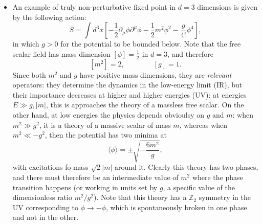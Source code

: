 \documentclass[a4paper,12pt]{article}
\numberwithin{equation}{section}
\begin{document}
\begin{itemize}
\item
An example of truly non-perturbative fixed point in $d = 3$ dimensions is given by the following action:
\begin{equation}
	S = \int d^3x \left[
	-\frac{1}{2} \partial_\mu \phi \partial^\mu \phi
	- \frac{1}{2} m^2 \phi^2 - \frac{g}{4!} \phi^4 \right],
\end{equation}
in which $g > 0$ for the potential to be bounded below.
Note that the free scalar field has mass dimension $\left[ \phi \right] = \frac{1}{2}$ in $d = 3$, and therefore
\begin{equation}
	\left[ m^2 \right] = 2,
	\qquad\qquad
	\left[ g \right] = 1.
\end{equation}
Since both $m^2$ and $g$ have positive mass dimensions, they are \emph{relevant} operators: they determine the dynamics in the low-energy limit (IR), but their importance decreases at higher and higher energies (UV): at energies $E \gg g, |m|$, this is approaches the theory of a massless free scalar.
On the other hand, at low energies the physics depends obvioulsy on $g$ and $m$: when $m^2 \gg g^2$, it is a theory of a massive scalar of mass $m$, whereas when $m^2 \ll -g^2$, then the potential has two minima at
\begin{equation}
	\langle \phi \rangle = \pm \sqrt{- \frac{6m^2}{g}},
\end{equation}
with excitations fo mass $\sqrt{2} |m|$ around it. Clearly this theory has two phases, and there must therefore be an intermediate value of $m^2$ where the phase transition happens (or working in units set by $g$, a specific value of the dimensionless ratio $m^2/g^2$). Note that this theory has a $\mathds{Z}_2$ symmetry in the UV corresponding to $\phi \to -\phi$, which is spontaneously broken in one phase and not in the other.


\end{itemize}
\end{document}
